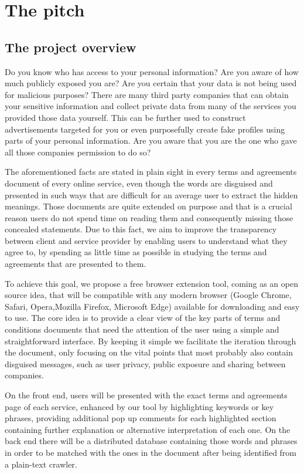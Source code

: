 \section{The pitch}

\subsection{The project overview}

Do you know who has access to your personal information? Are you aware of how 
much publicly exposed you are? Are you certain that your data is not being used 
for malicious purposes? There are many third party companies that can obtain 
your sensitive information and collect private data from many of the services 
you provided those data yourself. This can be further used to construct 
advertisements targeted for you or even purposefully create fake profiles using 
parts of your personal information. Are you aware that you are the one who gave 
all those companies permission to do so?

The aforementioned facts are stated in plain sight in every terms and agreements 
document of every online service, even though the words are disguised and 
presented in such ways that are difficult for an average user to extract the 
hidden meanings. Those documents are quite extended on purpose and that is a 
crucial reason users do not spend time on reading them and consequently missing 
those concealed statements. Due to this fact, we aim to improve the transparency 
between client and service provider by enabling users to understand what they 
agree to, by spending as little time as possible in studying the terms and 
agreements that are presented to them.

To achieve this goal, we propose a free browser extension tool, coming as an 
open source idea, that will be compatible with any modern browser (Google 
Chrome, Safari, Opera,Mozilla Firefox, Microsoft Edge) available for downloading 
and easy to use. The core idea is to provide a clear view of the key parts of 
terms and conditions documents that need the attention of the user using a 
simple and straightforward interface. By keeping it simple we facilitate the 
iteration through the document, only focusing on the vital points that most 
probably also contain disguised messages, such as user privacy, public exposure 
and sharing between companies.

On the front end, users will be presented with the exact terms and agreements 
page of each service, enhanced by our tool by highlighting keywords or key 
phrases, providing additional pop up comments for each highlighted section 
containing further explanation or alternative interpretation of each one. On the 
back end there will be a distributed database containing those words and phrases 
in order to be matched with the ones in the document after being identified from 
a plain-text crawler.

